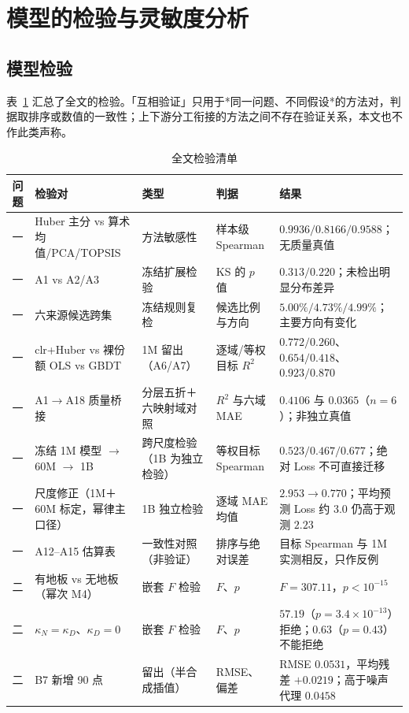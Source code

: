 \section{模型的检验与灵敏度分析}
\label{sec:6}

\subsection{模型检验}
\label{sec:6.1}

表~\ref{tab:checks} 汇总了全文的检验。「互相验证」只用于*同一问题、不同假设*的方法对，判据取排序或数值的一致性；上下游分工衔接的方法之间不存在验证关系，本文也不作此类声称。

\begin{table}[H]
\centering\footnotesize
\caption{全文检验清单}
\label{tab:checks}
\begin{tabularx}{\textwidth}{@{}c p{3.85cm}p{1.55cm}p{2.25cm}X@{}}
\toprule
问题 & 检验对 & 类型 & 判据 & 结果 \\
\midrule
一 & Huber 主分 vs 算术均值/PCA/TOPSIS & 方法敏感性 & 样本级 Spearman & $0.9936/0.8166/0.9588$；无质量真值 \\
一 & A1 vs A2/A3 & 冻结扩展检验 & KS 的 $p$ 值 & $0.313/0.220$；未检出明显分布差异 \\
一 & 六来源候选跨集 & 冻结规则复检 & 候选比例与方向 & $5.00\%/4.73\%/4.99\%$；主要方向有变化 \\
一 & clr+Huber vs 裸份额 OLS vs GBDT & 1M 留出（A6/A7） & 逐域/等权目标 $R^2$ & $0.772/0.260$、$0.654/0.418$、$0.923/0.870$ \\
一 & A1$\to$A18 质量桥接 & 分层五折＋六映射域对照 & $R^2$ 与六域 MAE & $0.4106$ 与 $0.0365$（$n=6$）；非独立真值 \\
一 & 冻结 1M 模型 $\to$ 60M $\to$ 1B & 跨尺度检验（1B 为独立检验） & 等权目标 Spearman & $0.523/0.467/0.677$；绝对 Loss 不可直接迁移 \\
一 & 尺度修正（1M＋60M 标定，幂律主口径） & 1B 独立检验 & 逐域 MAE 均值 & $2.953\to0.770$；平均预测 Loss 约 $3.0$ 仍高于观测 $2.23$ \\
一 & A12–A15 估算表 & 一致性对照（非验证） & 排序与绝对误差 & 目标 Spearman 与 1M 实测相反，只作反例 \\
二 & 有地板 vs 无地板（幂次 M4） & 嵌套 $F$ 检验 & $F$、$p$ & $F=307.11$，$p<10^{-15}$ \\
二 & $\kappa_N=\kappa_D$、$\kappa_D=0$ & 嵌套 $F$ 检验 & $F$、$p$ & $57.19$（$p=3.4\times10^{-13}$）拒绝；$0.63$（$p=0.43$）不能拒绝 \\
二 & B7 新增 90 点 & 留出（半合成插值） & RMSE、偏差 & RMSE $0.0531$，平均残差 $+0.0219$；高于噪声代理 $0.0458$ \\

\end{tabularx}
\end{table}

